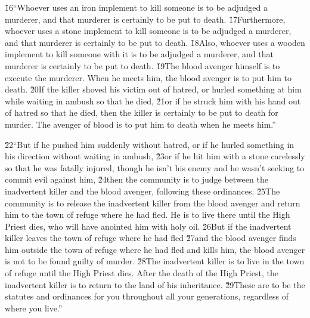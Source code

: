 \v{16}``Whoever uses an iron implement to kill someone is to be adjudged a murderer, and that murderer is certainly to be put to death. \v{17}Furthermore, whoever uses a stone implement to kill someone is to be adjudged a murderer, and that murderer is certainly to be put to death. \v{18}Also, whoever uses a wooden implement to kill someone with it is to be adjudged a murderer, and that murderer is certainly to be put to death. \v{19}The blood avenger himself is to execute the murderer. When he meets him, the blood avenger is to put him to death. \v{20}If the killer shoved his victim out of hatred, or hurled something at him while waiting in ambush so that he died, \v{21}or if he struck him with his hand out of hatred so that he died, then the killer is certainly to be put to death for murder. The avenger of blood is to put him to death when he meets him.''

\v{22}``But if he pushed him suddenly without hatred, or if he hurled something in his direction without waiting in ambush, \v{23}or if he hit him with a stone carelessly so that he was fatally injured, though he isn't his enemy and he wasn't seeking to commit evil against him, \v{24}then the community is to judge between the inadvertent killer and the blood avenger, following these ordinances. \v{25}The community is to release the inadvertent killer from the blood avenger and return him to the town of refuge where he had fled. He is to live there until the High Priest dies, who will have anointed him with holy oil. \v{26}But if the inadvertent killer leaves the town of refuge where he had fled \v{27}and the blood avenger finds him outside the town of refuge where he had fled and kills him, the blood avenger is not to be found guilty of murder. \v{28}The inadvertent killer is to live in the town of refuge until the High Priest dies. After the death of the High Priest, the inadvertent killer is to return to the land of his inheritance. \v{29}These are to be the statutes and ordinances for you throughout all your generations, regardless of where you live.''

